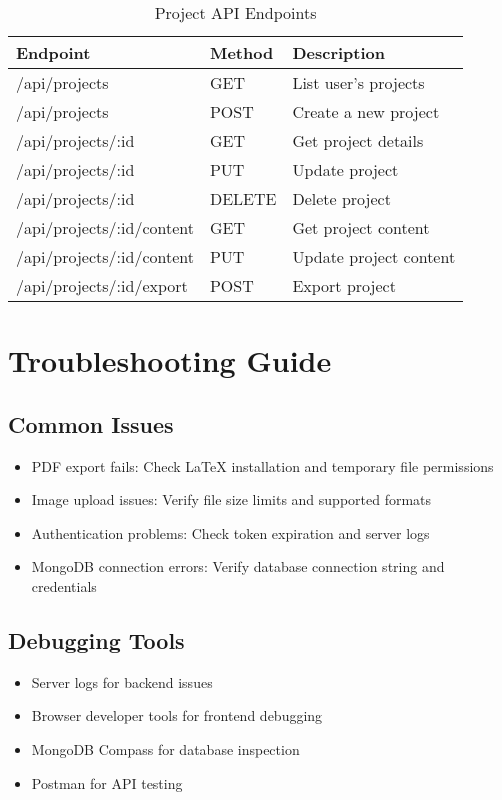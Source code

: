 \documentclass[12pt,a4paper]{book}
\begin{document}
\begin{table}[h]
\centering
\begin{tabularx}{\textwidth}{|l|X|X|}
\hline
\textbf{Endpoint} & \textbf{Method} & \textbf{Description} \\
\hline
/api/projects & GET & List user's projects \\
\hline
/api/projects & POST & Create a new project \\
\hline
/api/projects/:id & GET & Get project details \\
\hline
/api/projects/:id & PUT & Update project \\
\hline
/api/projects/:id & DELETE & Delete project \\
\hline
/api/projects/:id/content & GET & Get project content \\
\hline
/api/projects/:id/content & PUT & Update project content \\
\hline
/api/projects/:id/export & POST & Export project \\
\hline
\end{tabularx}
\caption{Project API Endpoints}
\end{table}

\chapter{Troubleshooting Guide}

\section{Common Issues}

\begin{itemize}
  \item PDF export fails: Check LaTeX installation and temporary file permissions
  \item Image upload issues: Verify file size limits and supported formats
  \item Authentication problems: Check token expiration and server logs
  \item MongoDB connection errors: Verify database connection string and credentials
\end{itemize}

\section{Debugging Tools}

\begin{itemize}
  \item Server logs for backend issues
  \item Browser developer tools for frontend debugging
  \item MongoDB Compass for database inspection
  \item Postman for API testing
\end{itemize}
\end{document}
